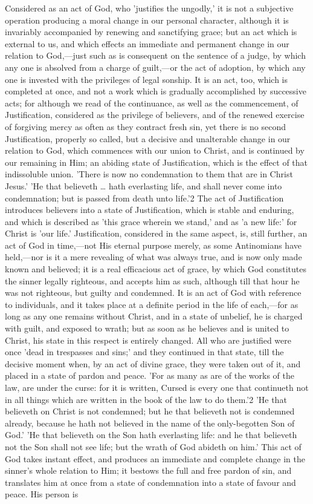 \documentclass[
]{book}
\begin{document}
Considered as an act of God, who 'justifies the ungodly,' it is not a subjective operation producing a moral change in our personal character, although it is invariably accompanied by renewing and sanctifying grace; but an act which is external to us, and which effects an immediate and permanent change in our relation to God,---just such as is consequent on the sentence of a judge, by which any one is absolved from a charge of guilt,---or the act of adoption, by which any one is invested with the privileges of legal sonship. It is an act, too, which is completed at once, and not a work which is gradually accomplished by successive acts; for although we read of the continuance, as well as the commencement, of Justification, considered as the privilege of believers, and of the renewed exercise of forgiving mercy as often as they contract fresh sin, yet there is no second Justification, properly so called, but a decisive and unalterable change in our relation to God, which commences with our union to Christ, and is continued by our remaining in Him; an abiding state of Justification, which is the effect of that indissoluble union. 'There is now no condemnation to them that are in Christ Jesus.' 'He that believeth \ldots{} hath everlasting life, and shall never come into condemnation; but is passed from death unto life.'2 The act of Justification introduces believers into a state of Justification, which is stable and enduring, and which is described as 'this grace wherein we stand,' and as 'a new life:' for Christ is 'our life.' Justification, considered in the same aspect, is, still further, an act of God in time,---not His eternal purpose merely, as some Antinomians have held,---nor is it a mere revealing of what was always true, and is now only made known and believed; it is a real efficacious act of grace, by which God constitutes the sinner legally righteous, and accepts him as such, although till that hour he was not righteous, but guilty and condemned. It is an act of God with reference to individuals, and it takes place at a definite period in the life of each,---for as long as any one remains without Christ, and in a state of unbelief, he is charged with guilt, and exposed to wrath; but as soon as he believes and is united to Christ, his state in this respect is entirely changed. All who are justified were once 'dead in trespasses and sins;' and they continued in that state, till the decisive moment when, by an act of divine grace, they were taken out of it, and placed in a state of pardon and peace. 'For as many as are of the works of the law, are under the curse: for it is written, Cursed is every one that continueth not in all things which are written in the book of the law to do them.'2 'He that believeth on Christ is not condemned; but he that believeth not is condemned already, because he hath not believed in the name of the only-begotten Son of God.' 'He that believeth on the Son hath everlasting life: and he that believeth not the Son shall not see life; but the wrath of God abideth on him.' This act of God takes instant effect, and produces an immediate and complete change in the sinner's whole relation to Him; it bestows the full and free pardon of sin, and translates him at once from a state of condemnation into a state of favour and peace. His person is 
\end{document}
